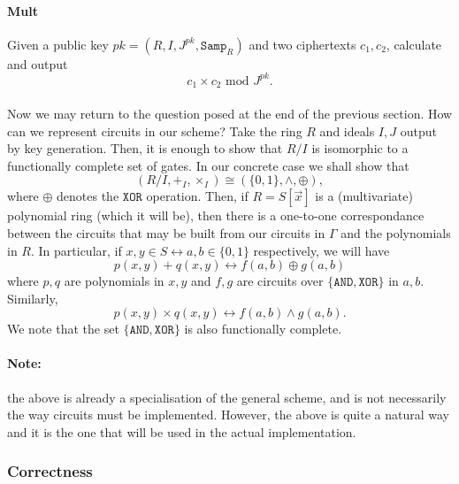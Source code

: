 \documentclass{article}
\theoremstyle{definition}
\theoremstyle{example}
\renewcommand{\mod}{\,\,\text{mod}\,\,}
\newcommand{\Samp}{\texttt{Samp}}
\begin{document}
\paragraph{Mult} Given a public key $pk = (R, I, J^{pk}, \Samp_R)$ and two
ciphertexts $c_1, c_2$, calculate and output
\[
  c_1 \times c_2 \mod J^{pk}.
\]
\paragraph{} Now we may return to the question posed at the end of the previous
section. How can we represent circuits in our scheme? Take the ring $R$ and
ideals $I, J$ output by key generation. Then, it is enough to show that $R/I$ is
isomorphic to a functionally complete set of gates. In our concrete case we shall show that
\[
  (R/I, +_I, \times_I) \cong (\{0, 1\}, \land, \oplus),
\]
where $\oplus$ denotes the $\texttt{XOR}$ operation. Then, if $R = S[\vec{x}]$ is a (multivariate)
polynomial ring (which it will be), then there is a one-to-one correspondance
between the circuits that may be built from our circuits in $\Gamma$ and the
polynomials in $R$. In particular, if $x, y \in S \leftrightarrow a, b \in \{0, 1\}$
respectively, we will have
\[
  p(x, y) + q(x, y) \leftrightarrow f(a, b) \oplus g(a, b)
\]
where $p, q$ are polynomials in $x, y$ and $f, g$ are circuits over
$\{\texttt{AND}, \texttt{XOR}\}$ in $a,
b$. Similarly,
\[
  p(x, y) \times q(x, y) \leftrightarrow f(a, b) \land g(a, b).
\]
We note that the set $\{\texttt{AND}, \texttt{XOR}\}$ is also functionally complete.
\paragraph{Note:} the above is already a specialisation of the general scheme,
and is not necessarily the way circuits must be implemented. However, the above
is quite a natural way and it is the one that will be used in the actual implementation.
\subsubsection{Correctness}
\end{document}
